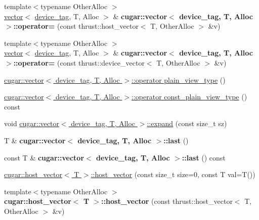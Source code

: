 \begin{DoxyCompactItemize}
\item 
\mbox{\label{group___basic_ga2e0c4f03eb5ec5b97ff0e7fb8dc6022d}} 
{\footnotesize template$<$typename Other\+Alloc $>$ }\\\hyperlink{structcugar_1_1vector}{vector}$<$ \hyperlink{structcugar_1_1device__tag}{device\+\_\+tag}, T, Alloc $>$ \& {\bfseries cugar\+::vector$<$ device\+\_\+tag, T, Alloc $>$\+::operator=} (const thrust\+::host\+\_\+vector$<$ T, Other\+Alloc $>$ \&v)
\item 
\mbox{\label{group___basic_ga971c7ff41b664bbbc3945ca528ed454b}} 
{\footnotesize template$<$typename Other\+Alloc $>$ }\\\hyperlink{structcugar_1_1vector}{vector}$<$ \hyperlink{structcugar_1_1device__tag}{device\+\_\+tag}, T, Alloc $>$ \& {\bfseries cugar\+::vector$<$ device\+\_\+tag, T, Alloc $>$\+::operator=} (const thrust\+::device\+\_\+vector$<$ T, Other\+Alloc $>$ \&v)
\item 
\hyperlink{group___basic_ga5cdeb00ca2a3ec211fe5ceccbc9b0a20}{cugar\+::vector$<$ device\+\_\+tag, T, Alloc $>$\+::operator plain\+\_\+view\+\_\+type} ()
\item 
\hyperlink{group___basic_gaeb5b6b16b7efd8be40fe5c410c95b53e}{cugar\+::vector$<$ device\+\_\+tag, T, Alloc $>$\+::operator const\+\_\+plain\+\_\+view\+\_\+type} () const
\item 
void \hyperlink{group___basic_ga872aa5811aafdfdae83d56c76378bf53}{cugar\+::vector$<$ device\+\_\+tag, T, Alloc $>$\+::expand} (const size\+\_\+t sz)
\item 
\mbox{\label{group___basic_ga2b1cb8fdb4e732c8655c852a77e21441}} 
T \& {\bfseries cugar\+::vector$<$ device\+\_\+tag, T, Alloc $>$\+::last} ()
\item 
\mbox{\label{group___basic_ga2330ce7a414f29a78aee3d96b2726bba}} 
const T \& {\bfseries cugar\+::vector$<$ device\+\_\+tag, T, Alloc $>$\+::last} () const
\item 
\hyperlink{group___basic_gaada99b7771790a67817b7280b75d8b19}{cugar\+::host\+\_\+vector$<$ T $>$\+::host\+\_\+vector} (const size\+\_\+t size=0, const T val=T())
\item 
\mbox{\label{group___basic_ga8c9619cd8fd503427835af77ecffc535}} 
{\footnotesize template$<$typename Other\+Alloc $>$ }\\{\bfseries cugar\+::host\+\_\+vector$<$ T $>$\+::host\+\_\+vector} (const thrust\+::host\+\_\+vector$<$ T, Other\+Alloc $>$ \&v)

\end{DoxyCompactItemize}
